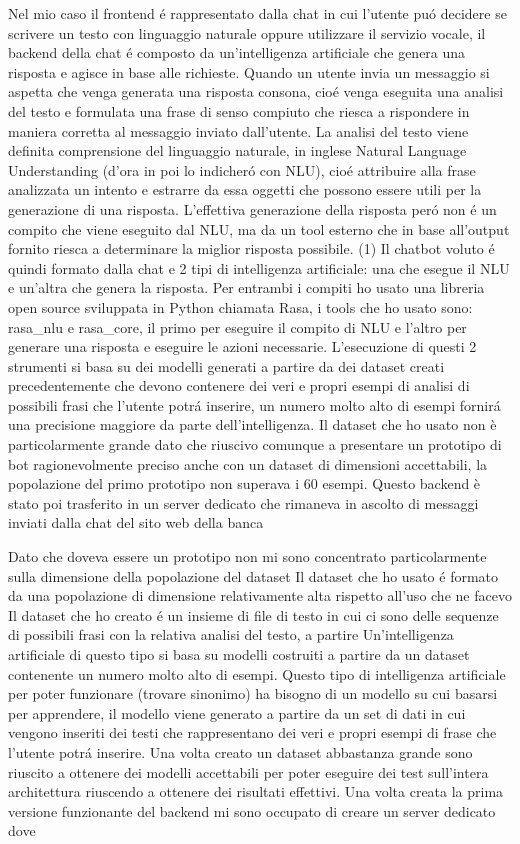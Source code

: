 Nel mio caso il frontend \'e rappresentato dalla chat in cui l'utente pu\'o decidere se scrivere un testo con linguaggio naturale oppure utilizzare il servizio vocale, il backend della chat \'e composto da un'intelligenza artificiale che genera una risposta e agisce in base alle richieste.
Quando un utente invia un messaggio si aspetta che venga generata una risposta consona, cio\'e venga eseguita una analisi del testo e formulata una frase di senso compiuto che riesca a rispondere in maniera corretta al messaggio inviato dall'utente. La analisi del testo viene definita comprensione del linguaggio naturale, in inglese Natural Language Understanding (d'ora in poi lo indicher\'o con NLU), cio\'e attribuire alla frase analizzata un intento e estrarre da essa oggetti che possono essere utili per la generazione di una risposta. L'effettiva generazione della risposta per\'o non \'e un compito che viene eseguito dal NLU, ma da un tool esterno che in base all'output fornito riesca a determinare la miglior risposta possibile.
(1)
Il chatbot voluto \'e quindi formato dalla chat e 2 tipi di intelligenza artificiale: una che esegue il NLU e un'altra che genera la risposta.
Per entrambi i compiti ho usato una libreria open source sviluppata in Python chiamata Rasa, i tools che ho usato sono: rasa\_nlu e rasa\_core, il primo per eseguire il compito di NLU e l'altro per generare una risposta e eseguire le azioni necessarie.
L'esecuzione di questi 2 strumenti si basa su dei modelli generati a partire da dei dataset creati precedentemente che devono contenere dei veri e propri esempi di analisi di possibili frasi che l'utente potr\'a inserire, un numero molto alto di esempi fornir\'a una precisione maggiore da parte dell'intelligenza.
Il dataset che ho usato non è particolarmente grande dato che riuscivo comunque a presentare un prototipo di bot ragionevolmente preciso anche con un dataset di dimensioni accettabili, la popolazione del primo prototipo non superava i 60 esempi.
Questo backend è stato poi trasferito in un server dedicato che rimaneva in ascolto di messaggi inviati dalla chat del sito web della banca


Dato che doveva essere un prototipo non mi sono concentrato particolarmente sulla dimensione della popolazione del dataset
Il dataset che ho usato \'e formato da una popolazione di dimensione relativamente alta rispetto all'uso che ne facevo
Il dataset che ho creato \'e un insieme di file di testo in cui ci sono delle sequenze di possibili frasi con la relativa analisi del testo, a partire 
Un'intelligenza artificiale di questo tipo si basa su modelli costruiti a partire da un dataset contenente un numero molto alto di esempi.
Questo tipo di intelligenza artificiale per poter funzionare (trovare sinonimo) ha bisogno di un modello su cui basarsi per apprendere, il modello viene generato a partire da un set di dati in cui vengono inseriti dei testi che rappresentano dei veri e propri esempi di frase che l'utente potr\'a inserire.
Una volta creato un dataset abbastanza grande sono riuscito a ottenere dei modelli accettabili per poter eseguire dei test sull'intera architettura riuscendo a ottenere dei risultati effettivi.
Una volta creata la prima versione funzionante del backend mi sono occupato di creare un server dedicato dove 


